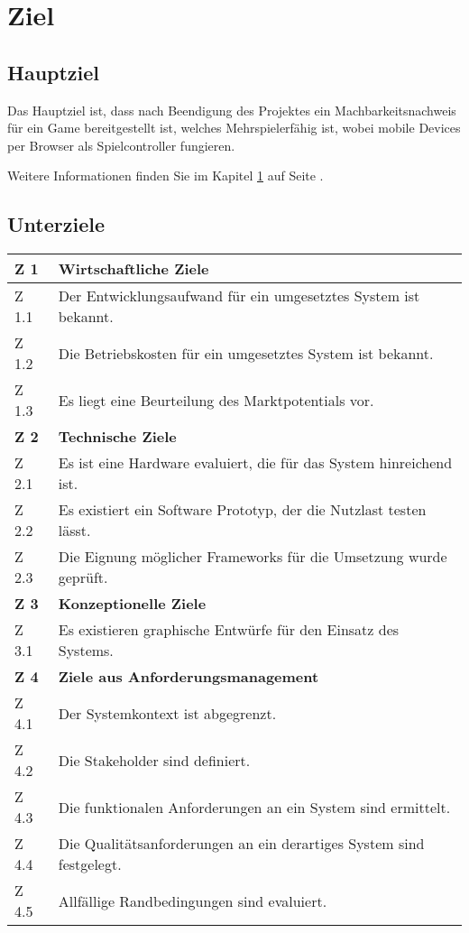 \chapter{Ziel}
\label{chap:ziel}

\section{Hauptziel}
Das Hauptziel ist, dass nach Beendigung des Projektes ein Machbarkeitsnachweis für ein Game bereitgestellt ist, welches Mehrspielerfähig ist, wobei mobile Devices per Browser als Spielcontroller fungieren.

Weitere Informationen finden Sie im Kapitel \ref{chap:ziel} auf Seite \pageref{chap:ziel}.


\begingroup
\setlength{\tabcolsep}{10pt} %
\renewcommand{\arraystretch}{1.5}
\section{Unterziele}
\begin{tabularx}{\textwidth}{ |l|X| }
  \hline
  \textbf{Z 1}	& \textbf{Wirtschaftliche Ziele}	\\	\hline
  Z 1.1	& Der Entwicklungsaufwand für ein umgesetztes System ist bekannt.  	\\	\hline
  Z 1.2	& Die Betriebskosten für ein umgesetztes System ist bekannt.  	\\	\hline
  Z 1.3	& Es liegt eine Beurteilung des Marktpotentials vor.  	\\	\hline
  \hline
  \textbf{Z 2}	& \textbf{Technische Ziele}	\\	\hline
  Z 2.1	& Es ist eine Hardware evaluiert, die für das System hinreichend ist.  	\\	\hline
  Z 2.2	& Es existiert ein Software Prototyp, der die Nutzlast testen lässt.  	\\	\hline
  Z 2.3	& Die Eignung möglicher Frameworks für die Umsetzung wurde geprüft.	\\	\hline
  \hline
  \textbf{Z 3}	& \textbf{Konzeptionelle Ziele}	\\	\hline
  Z 3.1	& Es existieren graphische Entwürfe für den Einsatz des Systems. 	\\	\hline 
  
  \hline
  \textbf{Z 4}	& \textbf{Ziele aus Anforderungsmanagement}	\\	\hline
  Z 4.1	& Der Systemkontext ist abgegrenzt.	\\	\hline
  Z 4.2	& Die Stakeholder sind definiert.	\\	\hline
  Z 4.3	& Die funktionalen Anforderungen an ein System sind ermittelt.	\\	\hline
  Z 4.4	& Die Qualitätsanforderungen an ein derartiges System sind festgelegt.	\\	\hline
  Z 4.5	& Allfällige Randbedingungen sind evaluiert. 	\\	\hline
\end{tabularx}
\endgroup
